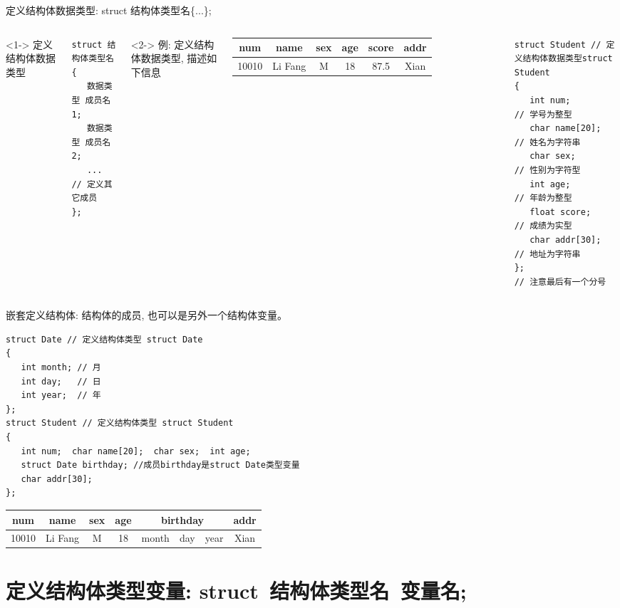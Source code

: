 \begin{frame}{定义结构体数据类型:  struct 结构体类型名\{...\};}
\begin{columns}
<1->
定义结构体数据类型
\begin{lstlisting}
struct 结构体类型名
{
   数据类型 成员名1;
   数据类型 成员名2;
   ... // 定义其它成员
};
\end{lstlisting}
<2->
例: 定义结构体数据类型, 描述如下信息
\begin{tabular}{|c|c|c|c|c|c|}
\hline 
num & name & sex & age & score & addr \\ 
\hline 
10010 & Li Fang & M & 18 & 87.5 & Xian \\ 
\hline 
\end{tabular} 
\begin{lstlisting}
struct Student // 定义结构体数据类型struct Student
{
   int num;        // 学号为整型 
   char name[20];  // 姓名为字符串 
   char sex;       // 性别为字符型 
   int age;        // 年龄为整型
   float score;    // 成绩为实型 
   char addr[30];  // 地址为字符串 
};                 // 注意最后有一个分号 
\end{lstlisting}
\end{columns}
\end{frame}

\begin{frame}{\small 嵌套定义结构体: 结构体的成员, 也可以是另外一个结构体变量。}
\vspace{-0.4cm}
\begin{lstlisting}
struct Date // 定义结构体类型 struct Date 
{
   int month; // 月
   int day;   // 日
   int year;  // 年
}; 
struct Student // 定义结构体类型 struct Student
{ 
   int num;  char name[20];  char sex;  int age;
   struct Date birthday; //成员birthday是struct Date类型变量
   char addr[30]; 
};
\end{lstlisting}
\begin{tabular}{|c|c|c|c|c|c|c|c|}
	\hline 
	num & name & sex & age & \multicolumn{3}{c|}{birthday} & addr \\ 
	\hline 
	10010 & Li Fang & M & 18 & month & day & year & Xian \\ 
	\hline 
\end{tabular} 
\medskip
\end{frame}

\section{定义结构体类型变量: struct\, 结构体类型名\, 变量名;}


